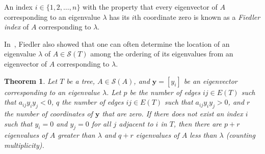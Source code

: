 \documentclass{article}
\newtheorem{theorem}{Theorem}[section]
\theoremstyle{definition}
\begin{document}
An index $i\in\{1,2,\ldots,n\}$ with the property that every eigenvector of $A$ corresponding to an eigenvalue $\lambda$ has its $i$th coordinate zero is known as a \emph{Fiedler index} of $A$ corresponding to $\lambda$. 

In~\cite{Fiedler1975}, Fiedler also showed that one can often determine the location of an eigenvalue $\lambda$ of $A\in\mathcal{S}(T)$ among the ordering of its eigenvalues from an eigenvector of $A$ corresponding to $\lambda$.
\begin{theorem}\label{thm:fiedler2}
Let $T$ be a tree, $A\in\mathcal{S}(A)$, and $\textbf{y}=[y_{i}]$ be an eigenvector corresponding to an eigenvalue $\lambda$.
Let $p$ be the number of edges $ij\in E(T)$ such that $a_{ij}y_{i}y_{j}<0$, $q$ the number of edges $ij\in E(T)$ such that $a_{ij}y_{i}y_{j}>0$, and $r$ the number of coordinates of $\textbf{y}$ that are zero. 
If there does not exist an index $i$ such that $y_{i}=0$ and $y_{j}=0$ for all $j$ adjacent to $i$ in $T$, then there are $p+r$ eigenvalues of $A$ greater than $\lambda$ and $q+r$ eigenvalues of $A$ less than $\lambda$ (counting multiplicity). 
\end{theorem}
\end{document}
